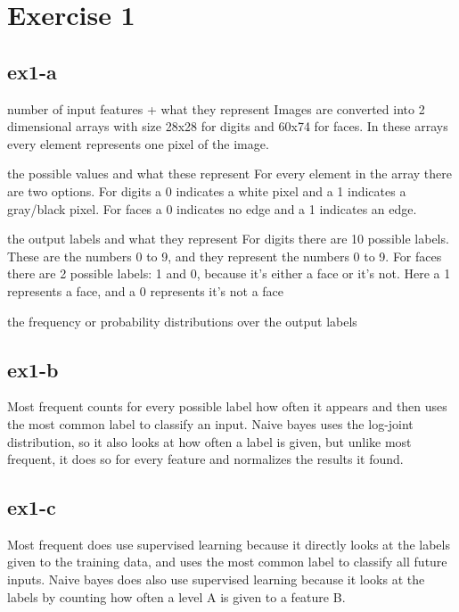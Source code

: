 \section{Exercise 1}
\label{sec:ex1}
\subsection{ex1-a}
number of input features + what they represent \n
Images are converted into 2 dimensional arrays with size 28x28 for digits and 60x74 for faces.
In these arrays every element represents one pixel of the image. 

the possible values and what these represent \n
For every element in the array there are two options. For digits a 0 indicates a white pixel
and a 1 indicates a gray/black pixel. For faces a 0 indicates no edge and a 1 indicates an edge.


the output labels and what they represent \n
For digits there are 10 possible labels. These are the numbers 0 to 9, and they represent 
the numbers 0 to 9.
For faces there are 2 possible labels: 1 and 0, because it's either a face or it's not. 
Here a 1 represents a face, and a 0 represents it's not a face

the frequency or probability distributions over the output labels \n

\subsection{ex1-b}
Most frequent counts for every possible label how often it appears and then uses the most
common label to classify an input.
Naive bayes uses the log-joint distribution, so it also looks at how often a label is given,
but unlike most frequent, it does so for every feature and normalizes the results it found.

\subsection{ex1-c}
Most frequent does use supervised learning because it directly looks at the labels given 
to the training data, and uses the most common label to classify all future inputs.
Naive bayes does also use supervised learning because it looks at the labels by counting 
how often a level A is given to a feature B.